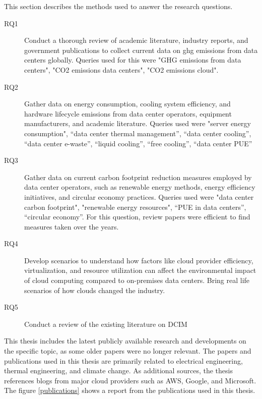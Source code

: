 \documentclass[
  a4paper,  %
  twoside,  %
  bibliography=totoc,
  headsepline,
  cleardoublepage=empty,
  parskip=half,
  draft=false
]{scrbook}
\begin{document}
This section describes the methods used to answer the research questions. 
\begin{description}
	\item[RQ1] 
	Conduct a thorough review of academic literature, industry reports, and government publications to collect current data on \gls{ghg} emissions from data centers globally. Queries used for this were "GHG emissions from data centers", "CO2 emissions data centers", "CO2 emissions cloud".
	
	\item[RQ2] 
	Gather data on energy consumption, cooling system efficiency, and hardware lifecycle emissions from data center operators, equipment manufacturers, and academic literature. Queries used were "server energy consumption", \enquote{data center thermal management}, \enquote{data center cooling}, \enquote{data center e-waste}, \enquote{liquid cooling}, \enquote{free cooling}, \enquote{data center PUE}
	
	\item[RQ3] 
	Gather data on current carbon footprint reduction measures employed by data center operators, such as renewable energy methods, energy efficiency initiatives, and circular economy practices. Queries used were "data center carbon footprint", "renewable energy resources", \enquote{PUE in data centers}, \enquote{circular economy}. For this question, review papers were efficient to find measures taken over the years.
	
	\item[RQ4] 
	Develop scenarios to understand how factors like cloud provider efficiency, virtualization, and resource utilization can affect the environmental impact of cloud computing compared to on-premises data centers. Bring real life scenarios of how clouds changed the industry.
	
	\item[RQ5] 
	Conduct a review of the existing literature on DCIM 
\end{description}

This thesis includes the latest publicly available research and developments on the specific topic, as some older papers were no longer relevant. The papers and publications used in this thesis are primarily related to electrical engineering, thermal engineering, and climate change. As additional sources, the thesis references blogs from major cloud providers such as AWS, Google, and Microsoft. The figure \ref{publications} shows a report from the publications used in this thesis.
\end{document}
